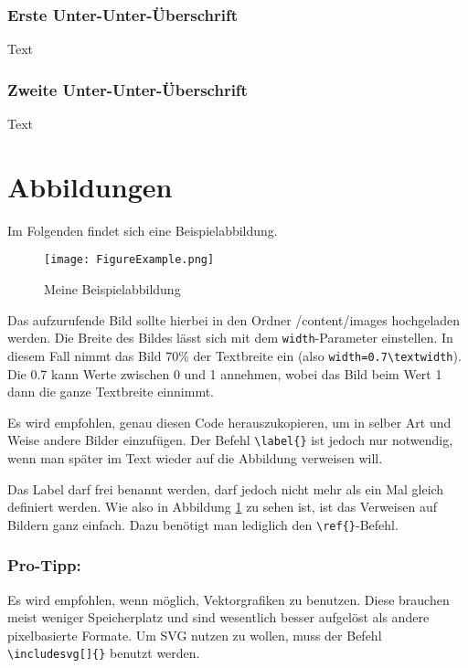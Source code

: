 \subsubsection{Erste Unter-Unter-Überschrift}
Text

\subsubsection{Zweite Unter-Unter-Überschrift}
Text


\section{Abbildungen}
Im Folgenden findet sich eine Beispielabbildung.

\begin{figure}[H]
    \centering
    \texttt{[image: FigureExample.png]}
    \caption{Meine Beispielabbildung}
    \label{fig:beispiel}
\end{figure}

Das aufzurufende Bild sollte hierbei in den Ordner /content/images hochgeladen werden. Die Breite des Bildes lässt sich mit dem \texttt{width}-Parameter einstellen. In diesem Fall nimmt das Bild 70\% der Textbreite ein (also \texttt{width=0.7\textbackslash{}textwidth}). Die 0.7 kann Werte zwischen 0 und 1 annehmen, wobei das Bild beim Wert 1 dann die ganze Textbreite einnimmt.

Es wird empfohlen, genau diesen Code herauszukopieren, um in selber Art und Weise andere Bilder einzufügen. Der Befehl \texttt{\textbackslash{}label\{\}} ist jedoch nur notwendig, wenn man später im Text wieder auf die Abbildung verweisen will.

Das Label darf frei benannt werden, darf jedoch nicht mehr als ein Mal gleich definiert werden. Wie also in Abbildung \ref{fig:beispiel} zu sehen ist, ist das Verweisen auf Bildern ganz einfach. Dazu benötigt man lediglich den \texttt{\textbackslash{}ref\{\}}-Befehl.

\subsubsection{Pro-Tipp:}
Es wird empfohlen, wenn möglich, Vektorgrafiken zu benutzen. Diese brauchen meist weniger Speicherplatz und sind wesentlich besser aufgelöst als andere pixelbasierte Formate. Um SVG nutzen zu wollen, muss der Befehl \texttt{\textbackslash{}includesvg[]\{\}} benutzt werden.



